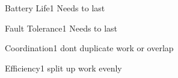 \begin{nonfunctional_requirement}{Battery Life}{1}
Needs to last
\end{nonfunctional_requirement}

\begin{nonfunctional_requirement}{Fault Tolerance}{1}
Needs to last
\end{nonfunctional_requirement}

\begin{nonfunctional_requirement}{Coordination}{1}
dont duplicate work or overlap
\end{nonfunctional_requirement}

\begin{nonfunctional_requirement}{Efficiency}{1}
split up work evenly
\end{nonfunctional_requirement}